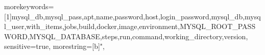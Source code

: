 

\usepackage{varioref}


\usepackage{datetime}


\usepackage{mathtools}



\usepackage[h]{esvect}

\usepackage{array}





\usepackage{listings}
\usepackage{listings-golang}

{
 morekeywords=[1]{mysql_db,mysql_pass,apt,name,password,host,login_password,mysql_db,mysql_user,with_items,jobs,build,docker,image,environment,MYSQL_ROOT_PASSWORD,MYSQL_DATABASE,steps,run,command,working_directory,version},
	sensitive=true,
	morestring=[b]",
}

